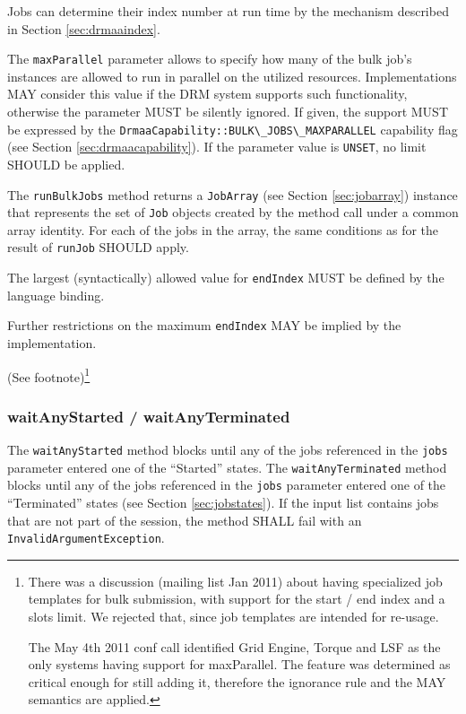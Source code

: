 \documentclass{article}
\newcommand{\h}[1]{\lstinline|#1|}
\newcommand{\langbind}[1]{\begin{shaded}#1\end{shaded}}
\newcommand{\rat}[1]{ {\tiny(See footnote)}\footnote{#1} }
\begin{document}
Jobs can determine their index number at run time by the mechanism described in Section \ref{sec:drmaaindex}. 

The \h{maxParallel} parameter allows to specify how many of the bulk job's instances are allowed to run in parallel on the utilized resources. Implementations MAY consider this value if the DRM system supports such functionality, otherwise the parameter MUST be silently ignored.  If given, the support MUST be expressed by the \h{DrmaaCapability::BULK\_JOBS\_MAXPARALLEL} capability flag (see Section \ref{sec:drmaacapability}). If the parameter value is \h{UNSET}, no limit SHOULD be applied.

The \h{runBulkJobs} method returns a \h{JobArray} (see Section \ref{sec:jobarray}) instance that represents the set of \h{Job} objects created by the method call under a common array identity. For each of the jobs in the array, the same conditions as for the result of \h{runJob} SHOULD apply. 

\langbind{
The largest (syntactically) allowed value for \h{endIndex} MUST be defined by the language binding.
}

Further restrictions on the maximum \h{endIndex} MAY be implied by the implementation. 

\rat{
There was a discussion (mailing list Jan 2011) about having specialized job templates for bulk submission, with support for the start / end index and a slots limit. We rejected that, since job templates are intended for re-usage. 

The May 4th 2011 conf call identified Grid Engine, Torque and LSF as the only systems having support for maxParallel. The feature was determined as critical enough for still adding it, therefore the ignorance rule and the MAY semantics are applied.
}

\subsubsection{waitAnyStarted / waitAnyTerminated}
\label{sec:waitanystarted}

The \h{waitAnyStarted} method blocks until any of the jobs referenced in the \h{jobs} parameter entered one of the \enquote{Started} states. The \h{waitAnyTerminated} method blocks until any of the jobs referenced in the \h{jobs} parameter entered one of the \enquote{Terminated} states (see Section \ref{sec:jobstates}). If the input list contains jobs that are not part of the session, the method SHALL fail with an \h{InvalidArgumentException}. 
\end{document}
